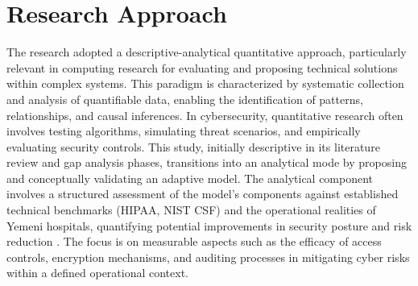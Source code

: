 \documentclass[12pt, a4paper, oneside]{report}
\begin{document}
	\section{Research Approach}
	The research adopted a descriptive-analytical quantitative approach, particularly relevant in computing research for evaluating and proposing technical solutions within complex systems. This paradigm is characterized by systematic collection and analysis of quantifiable data, enabling the identification of patterns, relationships, and causal inferences. In cybersecurity, quantitative research often involves testing algorithms, simulating threat scenarios, and empirically evaluating security controls. This study, initially descriptive in its literature review and gap analysis phases, transitions into an analytical mode by proposing and conceptually validating an adaptive model. The analytical component involves a structured assessment of the model's components against established technical benchmarks (HIPAA, NIST CSF) and the operational realities of Yemeni hospitals, quantifying potential improvements in security posture and risk reduction \cite{abdulrab2021assessing} \cite{al2023information} \cite{melaku2023context} \cite{nist2024sp80066r2}. The focus is on measurable aspects such as the efficacy of access controls, encryption mechanisms, and auditing processes in mitigating cyber risks within a defined operational context.
	
\end{document}
